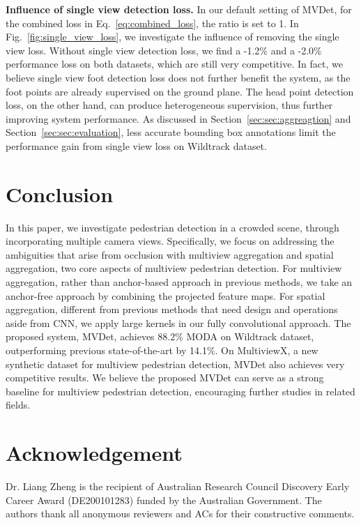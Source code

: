\documentclass[runningheads]{llncs}
\begin{document}
\textbf{Influence of single view detection loss.} 
In our default setting of MVDet, for the combined loss in Eq.~\ref{eq:combined_loss}, the ratio  is set to 1. 
In Fig.~\ref{fig:single_view_loss}, we investigate the influence of removing the single view loss. 
Without single view detection loss, we find a -1.2\% and a -2.0\% performance loss on both datasets, which are still very competitive. In fact, we believe single view foot detection loss does not further benefit the system, as the foot points are already supervised on the ground plane. The head point detection loss, on the other hand, can produce heterogeneous supervision, thus further improving system performance. As discussed in Section~\ref{sec:sec:aggreagtion} and Section~\ref{sec:sec:evaluation}, less accurate bounding box annotations limit the performance gain from single view loss on Wildtrack dataset. 















\section{Conclusion}
In this paper, we investigate pedestrian detection in a crowded scene, through incorporating multiple camera views. Specifically, we focus on addressing the ambiguities that arise from occlusion with multiview aggregation and spatial aggregation, two core aspects of multiview pedestrian detection. For multiview aggregation, rather than anchor-based approach in previous methods, we take an anchor-free approach by combining the projected feature maps. For spatial aggregation, different from previous methods that need design and operations aside from CNN, we apply large kernels in our fully convolutional approach. 
The proposed system, MVDet, achieves 88.2\% MODA on Wildtrack dataset, outperforming previous state-of-the-art by 14.1\%. On MultiviewX, a new synthetic dataset for multiview pedestrian detection, MVDet also achieves very competitive results. We believe the proposed MVDet can serve as a strong baseline for multiview pedestrian detection, encouraging further studies in related fields.



\section*{Acknowledgement}
Dr. Liang Zheng is the recipient of Australian Research Council Discovery Early Career Award (DE200101283) funded by the Australian Government. The authors thank all anonymous reviewers and ACs for their constructive comments.















\end{document}
